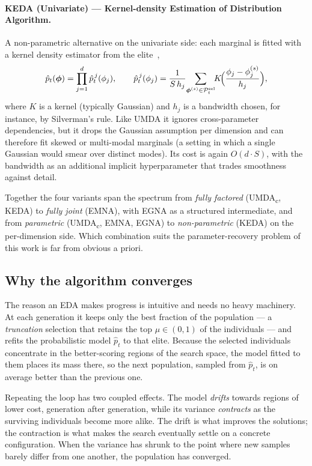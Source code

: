 \paragraph*{KEDA (Univariate) --- Kernel-density Estimation of
Distribution Algorithm.} A non-parametric alternative on the
univariate side: each marginal is fitted with a kernel density
estimator from the elite~\cite{soloviev2024edaspy},
\[
    \hat{p}_t(\boldsymbol{\phi}) = \prod_{j=1}^{d}
    \hat{p}_t^{\,j}(\phi_j),
    \qquad
    \hat{p}_t^{\,j}(\phi_j)
    = \frac{1}{S\,h_j}\!\sum_{\boldsymbol{\phi}^{(s)}\in\mathcal{P}_t^{\text{sel}}}\!\!
    K\!\Bigl(\frac{\phi_j - \phi_j^{(s)}}{h_j}\Bigr),
\]
where $K$ is a kernel (typically Gaussian) and $h_j$ is a bandwidth
chosen, for instance, by Silverman's rule. Like UMDA it ignores
cross-parameter dependencies, but it drops the Gaussian assumption
per dimension and can therefore fit skewed or multi-modal marginals
(a setting in which a single Gaussian would smear over distinct
modes). Its cost is again $O(d\cdot S)$, with the bandwidth as an
additional implicit hyperparameter that trades smoothness against
detail.

\medskip

Together the four variants span the spectrum from \emph{fully
factored} (UMDA\textsubscript{c}, KEDA) to \emph{fully joint} (EMNA),
with EGNA as a structured intermediate, and from \emph{parametric}
(UMDA\textsubscript{c}, EMNA, EGNA) to \emph{non-parametric} (KEDA)
on the per-dimension side. Which combination suits the
parameter-recovery problem of this work is far from obvious a
priori.

\subsection{Why the algorithm converges}

The reason an EDA makes progress is intuitive and needs no heavy
machinery. At each generation it keeps only the best fraction of the
population — a \emph{truncation} selection that retains the top
$\mu\in(0,1)$ of the individuals — and refits the probabilistic model
$\hat{p}_t$ to that elite. Because the selected individuals
concentrate in the better-scoring regions of the search space, the
model fitted to them places its mass there, so the next population,
sampled from $\hat{p}_t$, is on average better than the previous one.

Repeating the loop has two coupled effects. The model \emph{drifts}
towards regions of lower cost, generation after generation, while its
variance \emph{contracts} as the surviving individuals become more
alike. The drift is what improves the solutions; the contraction is
what makes the search eventually settle on a concrete configuration.
When the variance has shrunk to the point where new samples barely
differ from one another, the population has converged.

